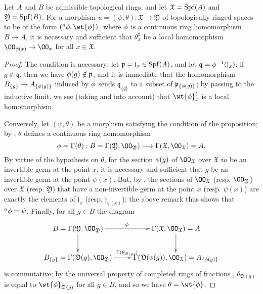 \begin{prop}[10.2.2]
\label{1.10.2.2}
Let $A$ and $B$ be admissible topological rings, and let $\mathfrak{X}=\operatorname{Spf}(A)$ and $\mathfrak{Y}=\operatorname{Spf}(B)$.
For a morphism $u=(\psi,\theta):\mathfrak{X}\to\mathfrak{Y}$ of topologically ringed spaces to be of the form $({}^a\vphi,\wt{\vphi})$, where $\phi$ is a continuous ring homomorphism $B\to A$, it is necessary and sufficient that $\theta_x^\sharp$ be a local homomorphism $\OO_{\vphi(x)}\to\OO_x$ for all $x\in\mathfrak{X}$.
\end{prop}

\begin{proof}
\label{proof-1.10.2.2}
The condition is necessary: let $\mathfrak{p}=\mathfrak{j}_x\in\operatorname{Spf}(A)$, and let $\mathfrak{q}=\phi^{-1}(\mathfrak{j}_x)$; if $g\not\in\mathfrak{q}$, then we have $\phi(g)\not\in\mathfrak{p}$, and it is immediate that the homomorphism
$B_{\{g\}}\to A_{\{\vphi(g)\}}$ induced by $\phi$  sends $\mathfrak{q}_{\{g\}}$ to a subset of $\mathfrak{p}_{\{\phi(g)\}}$; by passing to the inductive limit, we see (taking  and  into account) that $\wt{\vphi}_x^\sharp$ is a local homomorphism.

Conversely, let $(\psi,\theta)$ be a morphism satisfying the condition of the proposition;
by , $\theta$ defines a continuous ring homomorphism
\[
  \vphi=\Gamma(\theta):B=\Gamma(\mathfrak{Y},\OO_\mathfrak{Y})\to\Gamma(\mathfrak{X},\OO_\mathfrak{X})=A.
\]
By virtue of the hypothesis on $\theta$, for the section $\phi(g)$ of $\OO_\mathfrak{X}$ over $\mathfrak{X}$ to be an invertible germ at the point $x$, it is necessary and sufficient that $g$ be an invertible germ at the point $\psi(x)$.
But, by , the sections of $\OO_\mathfrak{X}$ (resp. $\OO_\mathfrak{Y}$) over $\mathfrak{X}$ (resp. $\mathfrak{Y}$) that have a non-invertible germ at the point $x$ (resp. $\psi(x)$) are exactly the elements of $\mathfrak{j}_x$
(resp. $\mathfrak{j}_{\psi(x)}$);
the above remark thus shows that ${}^a\phi=\psi$.
Finally, for all $g\in B$ the diagram
\[
  \xymatrix{
    B=\Gamma(\mathfrak{Y},\OO_\mathfrak{Y})\ar[r]^\vphi\ar[d] &
    \Gamma(\mathfrak{X},\OO_\mathfrak{X})=A\ar[d]\\
    B_{\{g\}}=\Gamma(\mathfrak{D}(g),\OO_\mathfrak{Y})\ar[r]^{\Gamma(\theta_{\mathfrak{D}(g)})} &
    \Gamma(\mathfrak{D}(\vphi(g)),\OO_\mathfrak{X})=A_{\{\vphi(g)\}}
  }
\]
is commutative; by the universal property of completed rings of fractions , $\theta_{\mathfrak{D}(g)}$ is equal to $\wt{\vphi}_{\mathfrak{D}(g)}$ for all $g\in B$, and so  we have $\theta=\wt{\vphi}$.
\end{proof}

